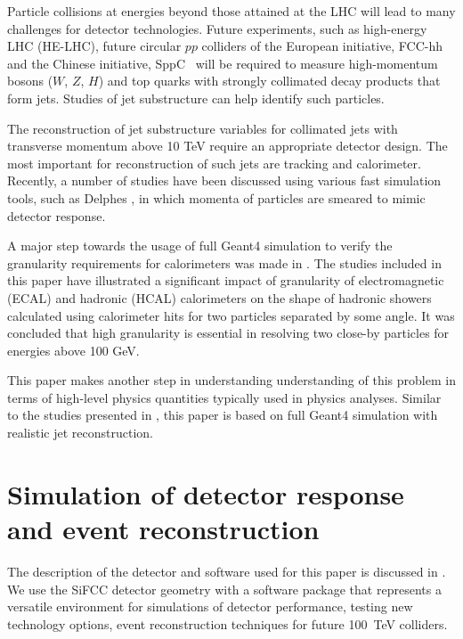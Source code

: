 \documentclass[final,1p,11pt]{elsarticle}
\begin{document}
Particle collisions at energies  beyond those attained at the LHC will lead to many challenges for detector technologies.
Future experiments, such as high-energy LHC (HE-LHC),
future circular $pp$ colliders of the European initiative, FCC-hh~\cite{Benedikt:2206376} and the Chinese initiative, SppC~\cite{Tang:2015qga} will be required to measure high-momentum bosons ($W$, $Z$, $H$) and top quarks with strongly 
collimated decay products that form jets.  Studies of jet substructure can help identify such particles.

The reconstruction of jet substructure  variables for collimated jets with transverse momentum above 10 TeV 
require an appropriate detector design. The most important for reconstruction of such jets are tracking and calorimeter.
Recently, a number of studies \cite{Calkins:2013ega,Chekanov:2015ihl,Coleman:2017fiq} 
have been discussed using various fast simulation tools, such as 
Delphes  \cite{deFavereau:2013fsa}, in which momenta of particles
are smeared to mimic detector response. 

A major step towards the usage of full Geant4 simulation to verify the granularity requirements 
for calorimeters was made in \cite{Chekanov:2016ppq}.
The studies included in this paper have illustrated a significant impact 
of granularity of electromagnetic (ECAL) and hadronic (HCAL) calorimeters on the
shape of hadronic showers  calculated using calorimeter hits 
for two particles separated  by some angle. It was concluded that high granularity is essential 
in resolving two close-by particles for energies above 100 GeV. 

This paper makes another step in understanding understanding of this problem in terms 
of high-level physics quantities typically used in physics analyses.
Similar to the studies presented in \cite{Chekanov:2016ppq}, this paper is based on full
Geant4 simulation with realistic jet reconstruction.

\section{Simulation of detector response and event reconstruction}
 
The description of the detector and software used for this paper is discussed in \cite{Chekanov:2016ppq}. 
We use the SiFCC detector geometry with a software package that
represents a versatile environment for simulations
of detector performance, testing new technology options, event reconstruction techniques for future
100~TeV colliders.
\end{document}
